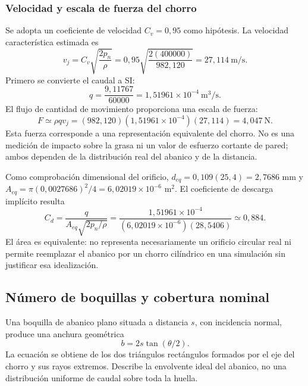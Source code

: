\subsubsection{Velocidad y escala de fuerza del chorro}
Se adopta un coeficiente de velocidad $C_v=0{,}95$ como hipótesis. La
velocidad característica estimada es
\begin{equation}
 v_j=C_v\sqrt{\frac{2p_n}{\rho}}
 =0{,}95\sqrt{\frac{2(400000)}{982{,}120}}
 =\boxed{27{,}114\ \mathrm{m/s}}.
 \label{eq:man-asp-vj}
\end{equation}
Primero se convierte el caudal a SI:
\begin{equation}
 q=\frac{9{,}11767}{60000}=1{,}51961\times10^{-4}\ \mathrm{m^3/s}.
\end{equation}
El flujo de cantidad de movimiento proporciona una escala de fuerza:
\begin{equation}
 F\simeq\rho qv_j
 =(982{,}120)(1{,}51961\times10^{-4})(27{,}114)
 =\boxed{4{,}047\ \mathrm{N}}.
 \label{eq:man-asp-f}
\end{equation}
Esta fuerza corresponde a una representación equivalente del chorro. No
es una medición de impacto sobre la grasa ni un valor de esfuerzo cortante
de pared; ambos dependen de la distribución real del abanico y de la distancia.

Como comprobación dimensional del orificio,
$d_{eq}=0{,}109(25{,}4)=2{,}7686$ mm y
$A_{eq}=\pi(0{,}0027686)^2/4=6{,}02019\times10^{-6}$ m$^2$.
El coeficiente de descarga implícito resulta
\begin{equation}
 C_d=\frac{q}{A_{eq}\sqrt{2p_n/\rho}}
 =\frac{1{,}51961\times10^{-4}}
 {(6{,}02019\times10^{-6})(28{,}5406)}
 \simeq0{,}884.
 \label{eq:man-asp-cd}
\end{equation}
El área es equivalente: no representa necesariamente un orificio circular
real ni permite reemplazar el abanico por un chorro cilíndrico en una
simulación sin justificar esa idealización.

\subsection{Número de boquillas y cobertura nominal}
\label{sec:man-asp-cobertura}

Una boquilla de abanico plano situada a distancia $s$, con incidencia normal,
produce una anchura geométrica
\begin{equation}
 b=2s\tan(\theta/2).
 \label{eq:man-asp-b}
\end{equation}
La ecuación se obtiene de los dos triángulos rectángulos formados por el eje
del chorro y sus rayos extremos. Describe la envolvente ideal del abanico,
no una distribución uniforme de caudal sobre toda la huella.

